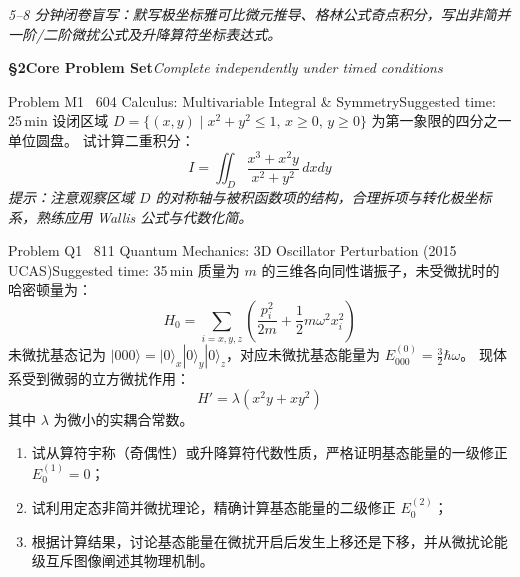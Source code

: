 \documentclass[a4paper,11pt]{article}
\begin{document}
\vspace{4pt}

\begin{tcolorbox}[
  enhanced, colback=white, colframe=border, boxrule=0.6pt, arc=2mm,
  left=4mm, right=4mm, top=3mm, bottom=3mm,
  fonttitle=\sffamily\bfseries\color{slate},
  title={\raisebox{0pt}{\color{royal}\rule{3pt}{10pt}}\hspace{4pt}Warm-Up Retrieval Workspace \textbar\ 白纸破冰与间隔提取草稿区},
  colbacktitle=paper, coltitle=slate,
  titlerule=0pt, toptitle=2mm, bottomtitle=2mm
]
\textcolor{mist}{\footnotesize\itshape 5--8 分钟闭卷盲写：默写极坐标雅可比微元推导、格林公式奇点积分，写出非简并一阶/二阶微扰公式及升降算符坐标表达式。}
\vspace{9.0cm}
\end{tcolorbox}

\clearpage

{\Large\sffamily\bfseries\color{navy} \S 2\quad Core Problem Set}\hfill{\small\sffamily\color{mist}\itshape Complete independently under timed conditions}

\vspace{8pt}

\begin{problem}{Problem M1 \textbar\ 604 Calculus: Multivariable Integral \& Symmetry}{Suggested time: 25\,min}
设闭区域 $D = \{(x,y) \mid x^2 + y^2 \le 1, \, x \ge 0, \, y \ge 0\}$ 为第一象限的四分之一单位圆盘。
试计算二重积分：
\[
  I = \iint_D \frac{x^3 + x^2 y}{x^2 + y^2}\,dxdy
\]
\textit{提示：注意观察区域 $D$ 的对称轴与被积函数项的结构，合理拆项与转化极坐标系，熟练应用 Wallis 公式与代数化简。}
\end{problem}

\vspace{6pt}

\begin{problem}{Problem Q1 \textbar\ 811 Quantum Mechanics: 3D Oscillator Perturbation (2015 UCAS)}{Suggested time: 35\,min}
质量为 $m$ 的三维各向同性谐振子，未受微扰时的哈密顿量为：
\[
  H_0 = \sum_{i=x,y,z} \left( \frac{p_i^2}{2m} + \frac{1}{2}m\omega^2 x_i^2 \right)
\]
未微扰基态记为 $|000\rangle = |0\rangle_x |0\rangle_y |0\rangle_z$，对应未微扰基态能量为 $E_{000}^{(0)} = \frac{3}{2}\hbar\omega$。
现体系受到微弱的立方微扰作用：
\[
  H' = \lambda (x^2 y + x y^2)
\]
其中 $\lambda$ 为微小的实耦合常数。
\begin{enumerate}[leftmargin=1.8em, itemsep=2pt, topsep=1pt]
  \item 试从算符宇称（奇偶性）或升降算符代数性质，严格证明基态能量的一级修正 $E_0^{(1)} = 0$；
  \item 试利用定态非简并微扰理论，精确计算基态能量的二级修正 $E_0^{(2)}$；
  \item 根据计算结果，讨论基态能量在微扰开启后发生上移还是下移，并从微扰论能级互斥图像阐述其物理机制。
\end{enumerate}
\end{problem}
\end{document}

